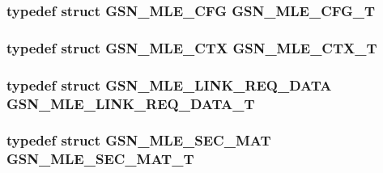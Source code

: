 \hypertarget{a00527_a7d33a4e5e3f74734f27df81430a43535}{
\subsubsection[{GSN\_\-MLE\_\-CFG\_\-T}]{\setlength{\rightskip}{0pt plus 5cm}typedef struct {\bf GSN\_\-MLE\_\-CFG} {\bf GSN\_\-MLE\_\-CFG\_\-T}}}
\label{a00527_a7d33a4e5e3f74734f27df81430a43535}
\hypertarget{a00527_a592894f5841d4b4e6fe61fa65893b951}{
\subsubsection[{GSN\_\-MLE\_\-CTX\_\-T}]{\setlength{\rightskip}{0pt plus 5cm}typedef struct {\bf GSN\_\-MLE\_\-CTX} {\bf GSN\_\-MLE\_\-CTX\_\-T}}}
\label{a00527_a592894f5841d4b4e6fe61fa65893b951}
\hypertarget{a00527_a26296abd5a01a53cb32594e305e1fd5f}{
\subsubsection[{GSN\_\-MLE\_\-LINK\_\-REQ\_\-DATA\_\-T}]{\setlength{\rightskip}{0pt plus 5cm}typedef struct {\bf GSN\_\-MLE\_\-LINK\_\-REQ\_\-DATA} {\bf GSN\_\-MLE\_\-LINK\_\-REQ\_\-DATA\_\-T}}}
\label{a00527_a26296abd5a01a53cb32594e305e1fd5f}
\hypertarget{a00527_a02cb6a04a0b957eb00dee76c2762b407}{
\subsubsection[{GSN\_\-MLE\_\-SEC\_\-MAT\_\-T}]{\setlength{\rightskip}{0pt plus 5cm}typedef struct {\bf GSN\_\-MLE\_\-SEC\_\-MAT} {\bf GSN\_\-MLE\_\-SEC\_\-MAT\_\-T}}}
\label{a00527_a02cb6a04a0b957eb00dee76c2762b407}



